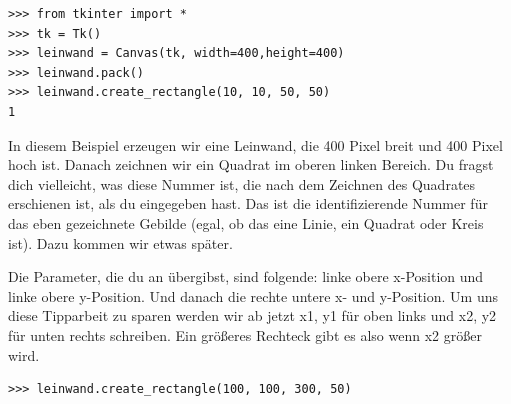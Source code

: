 \begin{Verbatim}[frame=single]
>>> from tkinter import *
>>> tk = Tk()
>>> leinwand = Canvas(tk, width=400,height=400)
>>> leinwand.pack()
>>> leinwand.create_rectangle(10, 10, 50, 50)
1
\end{Verbatim}
In diesem Beispiel erzeugen wir eine Leinwand, die 400 Pixel breit und 400 Pixel hoch ist. Danach zeichnen wir ein Quadrat im oberen linken Bereich. Du fragst dich vielleicht, was diese Nummer ist, die nach dem Zeichnen des Quadrates erschienen ist, als du  eingegeben hast. Das ist die identifizierende Nummer für das eben gezeichnete Gebilde (egal, ob das eine Linie, ein Quadrat oder Kreis ist). Dazu kommen wir etwas später.

Die Parameter, die du an  übergibst, sind folgende: linke obere x-Position und linke obere y-Position. Und danach die rechte untere x- und y-Position. Um uns diese Tipparbeit zu sparen werden wir ab jetzt x1, y1 für oben links und x2, y2 für unten rechts schreiben. Ein größeres Rechteck gibt es also wenn x2 größer wird.

\begin{Verbatim}[frame=single]
>>> leinwand.create_rectangle(100, 100, 300, 50)
\end{Verbatim}

